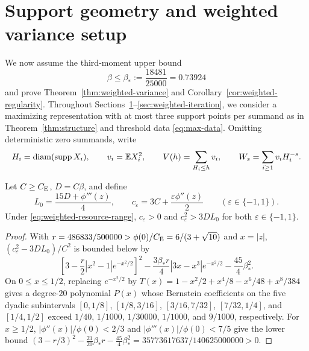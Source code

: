 \section{Support geometry and weighted variance setup}\label{sec:weighted-shape}

We now assume the third-moment upper bound
\begin{equation}\label{eq:weighted-resource-range}
                       \beta\le\beta_*:=\frac{18481}{25000}=0.73924
\end{equation}
and prove Theorem~\ref{thm:weighted-variance} and
Corollary~\ref{cor:weighted-regularity}. Throughout
Sections~\ref{sec:weighted-shape}--\ref{sec:weighted-iteration}, we consider
a maximizing representation with at most three support points per summand as
in Theorem~\ref{thm:structure} and threshold data \eqref{eq:max-data}.
Omitting deterministic zero summands, write
\[
 H_i=\operatorname{diam}(\operatorname{supp} X_i),\qquad v_i=\mathbb E X_i^2,\qquad
 V(h)=\sum_{H_i\le h}v_i,\qquad
 W_s=\sum_{i\ge1} v_iH_i^{-s}.
\]

\begin{lemma}\label{lem:weighted-scalar}
Let $C\ge C_{\mathrm E}$, $D=C\beta$, and define
\[
 L_0=\frac{15D+\phi'''(z)}4,\qquad
 c_\varepsilon=3C+\frac{\varepsilon\phi''(z)}{2}\qquad
 (\varepsilon\in\{-1,1\}).
\]
Under \eqref{eq:weighted-resource-range}, $c_\varepsilon>0$ and
$c_\varepsilon^2>3DL_0$ for both $\varepsilon\in\{-1,1\}$.
\end{lemma}
\begin{proof}
With $r=486833/500000>\phi(0)/C_{\mathrm E}=6/(3+\sqrt{10})$ and $x=|z|$,
$(c_\varepsilon^2-3DL_0)/C^2$ is bounded below by
\[
 \left[3-\frac r2|x^2-1|e^{-x^2/2}\right]^2
 -\frac{3\beta_*r}{4}|3x-x^3|e^{-x^2/2}
 -\frac{45}{4}\beta_*^2.
\]
On $0\le x\le1/2$, replacing $e^{-x^2/2}$ by $T(x)=1-x^2/2+x^4/8-x^6/48+x^8/384$
gives a degree-$20$ polynomial $P(x)$ whose Bernstein coefficients on the
five dyadic subintervals $[0,1/8]$, $[1/8,3/16]$, $[3/16,7/32]$, $[7/32,1/4]$,
and $[1/4,1/2]$ exceed $1/40$, $1/1000$, $1/30000$, $1/1000$, and $9/1000$,
respectively. For $x\ge1/2$, $|\phi''(x)|/\phi(0)<2/3$ and
$|\phi'''(x)|/\phi(0)<7/5$ give the lower bound
$(3-r/3)^2-\frac{21}{20}\beta_*r-\frac{45}{4}\beta_*^2=35773617637/140625000000>0$.
\end{proof}

